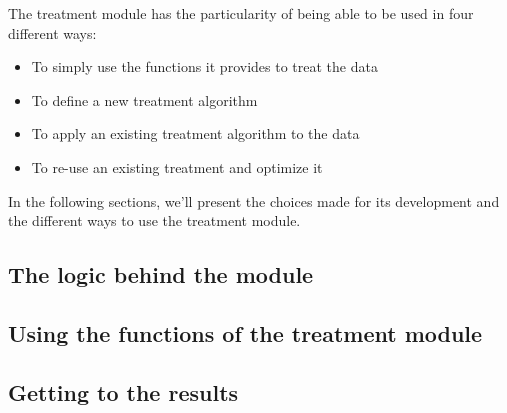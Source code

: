 The treatment module has the particularity of being able to be used in four different ways:
\begin{itemize}
    \item To simply use the functions it provides to treat the data
    \item To define a new treatment algorithm
    \item To apply an existing treatment algorithm to the data
    \item To re-use an existing treatment and optimize it
\end{itemize}

In the following sections, we'll present the choices made for its development and the different ways to use the treatment module.

\subsection{The logic behind the module}
    

\subsection{Using the functions of the treatment module}
    

\subsection{Getting to the results}
    
